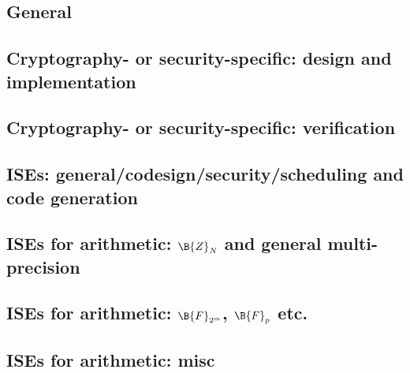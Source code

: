 
\subsection*{General}
\cite{SCARV:Gutmann:00}
\cite{SCARV:WuWeaAus:01}
\cite{SCARV:MTRGS:99}
\cite{SCARV:GGHJPTW:11}
\cite{SCARV:CosLebDev:16}

\subsection*{Cryptography- or security-specific: design and implementation}
\cite{SCARV:FouMoo:05,SCARV:Fournier:07,SCARV:KocSavGro:08,SCARV:TheSisPne:09,SCARV:TilKirSze:10,SCARV:NREAMM:12,SCARV:YumSav:15,SCARV:RagAmbPar:15,SCARV:AweAus:17,SCARV:YHEF:18,SCARV:WJWDGSN:18,SCARV:ZHCPH:18}

\subsection*{Cryptography- or security-specific: verification}
\cite{SCARV:KZDN:18}

\subsection*{ISEs: general/codesign/security/scheduling and code generation}
\cite{SCARV:Fiskiran:05}
\cite{SCARV:BarGioMar:09}
\cite{SCARV:RegIen:16}
\cite{SCARV:FazLopOli:18}
\cite{SCARV:KLWGSTW:06,SCARV:GIPTV:06}
\cite{SCARV:RCSBKBLI:09}
\cite{SCARV:ManGre:10,SCARV:ManMagGre:10,SCARV:Manley:11}

\subsection*{ISEs for arithmetic: $\B{Z}_{N}$   and general multi-precision}
\cite{SCARV:Gro:02,SCARV:Gro:03,SCARV:GroKam:03:a,SCARV:GAST:05,SCARV:GroTilSze:07}
\subsection*{ISEs for arithmetic: $\B{F}_{2^m}$, $\B{F}_{p}$ etc.}
\cite{SCARV:GroKam:03:b,SCARV:FisLee:04,SCARV:GroKumPaa:04,SCARV:KumPaa:04,SCARV:BBGM:08,SCARV:AELNP:20}

\subsection*{ISEs for arithmetic: misc}
\cite{SCARV:GroKam:03,SCARV:GroSav:04,SCARV:VejPagGro:07}

